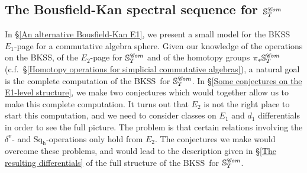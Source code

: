 \documentclass[11pt]{amsart} \renewcommand{\baselinestretch}{1.2}
\theoremstyle{plain}
\numberwithin{equation}{section} %
\theoremstyle{plain}
\numberwithin{equation}{chapter} %
\newcommand{\scrC}{\mathscr{C}}
\newcommand{\calw}{\mathcal{W}}
\newcommand{\calMhv}{\mathcal{M}_\mathrm{hv}}
\newcommand{\HA}[1]{H#1}
\newcommand{\quadgrad}[1]{\mathrm{q}_{#1}}
\newcommand{\algs}{{\scrC\!\textit{\normalfont\textit{om}}}}
\newcommand{\E}[5]{[E^{#1}_{#2}#3]^{#4}_{#5}}
\newcommand{\uver}{^\mathrm{v}}
\newcommand{\dhor}{_\mathrm{h}}
\newcommand{\Sqh}{\mathrm{Sq}\dhor}
\newcommand{\deltav}{\delta\uver}
\newcommand{\dual}{\mathbf{D}}
\newcommand{\BKSS}{BKSS}
\newcommand{\SubsectionOrSection}[1]{\subsection{#1}}
\begin{document}
\begin{Introduction}
\SubsectionOrSection{The Bousfield-Kan spectral sequence for $\mathbb{S}^{\algs}_T$}
In \S\ref{An alternative Bousfield-Kan E1}, we present a small model for the \BKSS\ $E_1$-page for a commutative algebra sphere. 
Given our knowledge of the operations on the \BKSS, of the $E_2$-page for $\mathbb{S}^{\algs}_T$ and of the homotopy groups $\pi_*\mathbb{S}^{\algs}_T$ (c.f.\ \S\ref{Homotopy operations for simplicial commutative algebras}), a natural goal is the complete computation of the \BKSS\ for $\mathbb{S}^{\algs}_T$. In \S\ref{Some conjectures on the E1-level structure}, we make two conjectures which would together allow us to make this complete computation. It turns out that $E_2$ is not the right place to start this computation, and we need to consider classes on $E_1$ and $d_1$ differentials in order to see the full picture. The problem is that certain relations involving the $\deltav$- and $\Sqh$-operations only hold from $E_2$. The conjectures we make would overcome these problems, and would lead to the description given in \S\ref{The resulting differentials} of the full structure of the \BKSS\ for $\mathbb{S}^{\algs}_T$.



%
%
%




\end{Introduction}
\end{document}
